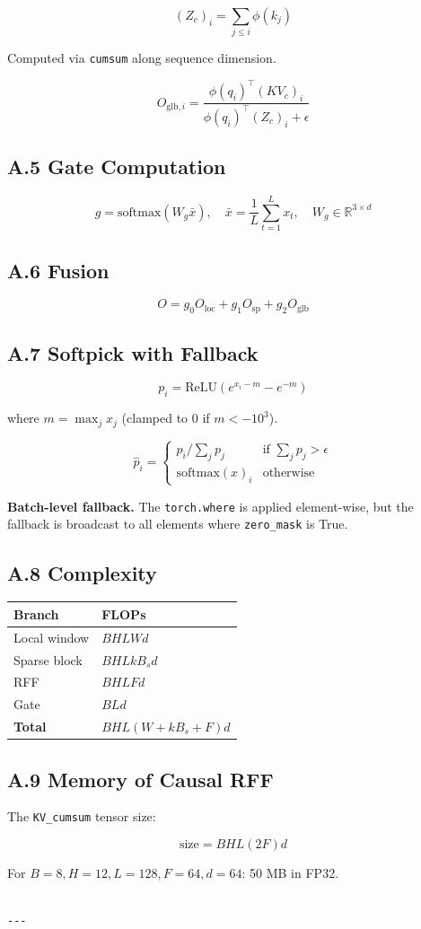 \[
(Z_c)_i = \sum_{j \leq i} \phi(k_j)
\tag{A.7}
\]

Computed via \texttt{cumsum} along sequence dimension.

\[
O_{\text{glb}, i} = \frac{\phi(q_i)^\top (KV_c)_i}{\phi(q_i)^\top (Z_c)_i + \epsilon}
\tag{A.8}
\]

\subsection{A.5 Gate Computation}

\[
g = \text{softmax}(W_g \bar{x}), \quad
\bar{x} = \frac{1}{L} \sum_{t=1}^{L} x_t, \quad
W_g \in \mathbb{R}^{3 \times d}
\tag{A.9}
\]

\subsection{A.6 Fusion}

\[
O = g_0 O_{\text{loc}} + g_1 O_{\text{sp}} + g_2 O_{\text{glb}}
\tag{A.10}
\]

\subsection{A.7 Softpick with Fallback}

\[
p_i = \text{ReLU}(e^{x_i - m} - e^{-m})
\tag{A.11}
\]

where $m = \max_j x_j$ (clamped to $0$ if $m < -10^3$).

\[
\hat{p}_i = \begin{cases} p_i / \sum_j p_j & \text{if } \sum_j p_j > \epsilon \\ \text{softmax}(x)_i & \text{otherwise} \end{cases}
\tag{A.12}
\]

\textbf{Batch-level fallback.} The \texttt{torch.where} is applied element-wise, but 
the fallback is broadcast to all elements where \texttt{zero\_mask} is True.

\subsection{A.8 Complexity}

\begin{table}[H]
\centering
\small
\begin{tabular}{ll}
\toprule
\textbf{Branch} & \textbf{FLOPs} \\
\midrule
Local window & $B H L W d$ \\
Sparse block & $B H L k B_s d$ \\
RFF & $B H L F d$ \\
Gate & $B L d$ \\
\textbf{Total} & $B H L (W + k B_s + F) d$ \\
\bottomrule
\end{tabular}
\end{table}

\subsection{A.9 Memory of Causal RFF}

The \texttt{KV\_cumsum} tensor size:

\[
\text{size} = B H L (2F) d
\tag{A.13}
\]

For $B=8, H=12, L=128, F=64, d=64$: 50 MB in FP32.
\begin{lstlisting}

---
\end{lstlisting}